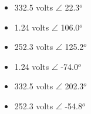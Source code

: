 \begin{itemize}
\item{} 332.5 volts $\angle$ 22.3$^{o}$
\vskip 5pt 
\item{} 1.24 volts $\angle$ 106.0$^{o}$ 
\vskip 5pt 
\item{} 252.3 volts $\angle$ 125.2$^{o}$ 
\vskip 5pt 
\item{} 1.24 volts $\angle$ -74.0$^{o}$
\vskip 5pt 
\item{} 332.5 volts $\angle$ 202.3$^{o}$
\vskip 5pt 
\item{} 252.3 volts $\angle$ -54.8$^{o}$
\end{itemize}






